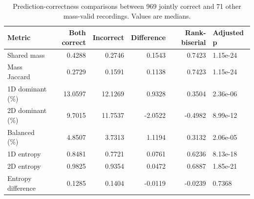 \begin{table}[t]
\caption{Prediction-correctness comparisons between 969 jointly correct and 71 other mass-valid recordings. Values are medians.}
\label{tab:05_prediction_correctness}
\begin{tabular}{lrrrrl}
\toprule
Metric & Both correct & Incorrect & Difference & Rank-biserial & Adjusted p \\
\midrule
Shared mass & 0.4288 & 0.2746 & 0.1543 & 0.7423 & 1.15e-24 \\
Mass Jaccard & 0.2729 & 0.1591 & 0.1138 & 0.7423 & 1.15e-24 \\
1D dominant (\%) & 13.0597 & 12.1269 & 0.9328 & 0.3504 & 2.36e-06 \\
2D dominant (\%) & 9.7015 & 11.7537 & -2.0522 & -0.4982 & 8.99e-12 \\
Balanced (\%) & 4.8507 & 3.7313 & 1.1194 & 0.3132 & 2.06e-05 \\
1D entropy & 0.8481 & 0.7721 & 0.0761 & 0.6236 & 8.13e-18 \\
2D entropy & 0.9825 & 0.9354 & 0.0472 & 0.6887 & 1.85e-21 \\
Entropy difference & 0.1285 & 0.1404 & -0.0119 & -0.0239 & 0.7368 \\
\bottomrule
\end{tabular}
\end{table}
